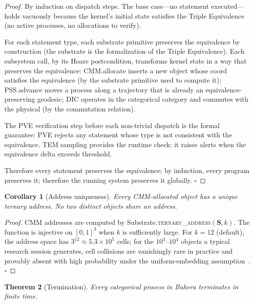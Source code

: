 \documentclass[11pt,twocolumn,a4paper]{article}
\newtheorem{theorem}{Theorem}[section]
\newtheorem{corollary}[theorem]{Corollary}
\newcommand{\Scoord}{\mathbf{S}}
\begin{document}
\begin{proof}
By induction on dispatch steps. The base case---no statement executed---holds vacuously because the kernel's initial state satisfies the Triple Equivalence (no active processes, no allocations to verify).

For each statement type, each substrate primitive preserves the equivalence by construction (the substrate is the formalization of the Triple Equivalence). Each subsystem call, by its Hoare postcondition, transforms kernel state in a way that preserves the equivalence: CMM.allocate inserts a new object whose coord satisfies the equivalence (by the substrate primitive used to compute it); PSS.advance moves a process along a trajectory that is already an equivalence-preserving geodesic; DIC operates in the categorical category and commutes with the physical (by the commutation relation).

The PVE verification step before each non-trivial dispatch is the formal guarantee: PVE rejects any statement whose type is not consistent with the equivalence. TEM sampling provides the runtime check: it raises alerts when the equivalence delta exceeds threshold.

Therefore every statement preserves the equivalence; by induction, every program preserves it; therefore the running system preserves it globally. $\square$
\end{proof}

\begin{corollary}[Address uniqueness]
\label{cor:addr_unique}
Every CMM-allocated object has a unique ternary address. No two distinct objects share an address.
\end{corollary}

\begin{proof}
CMM addresses are computed by Substrate.\textsc{ternary\_address}$(\Scoord, k)$. The function is injective on $[0,1]^3$ when $k$ is sufficiently large. For $k = 12$ (default), the address space has $3^{12} \approx 5.3 \times 10^5$ cells; for the $10^3$--$10^4$ objects a typical research session generates, cell collisions are vanishingly rare in practice and provably absent with high probability under the uniform-embedding assumption~\cite{cover2006elements}. $\square$
\end{proof}

\begin{theorem}[Termination]
\label{thm:termination}
Every categorical process in Buhera terminates in finite time.
\end{theorem}
\end{document}
